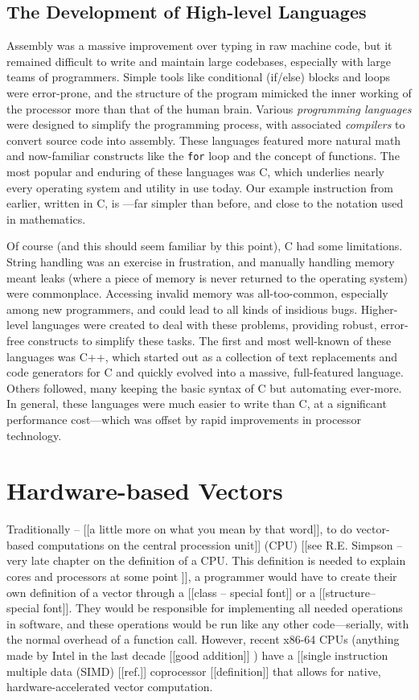 \documentclass[12pt,twoside]{reedthesis}
\begin{document}
\subsection{The Development of High-level Languages}

Assembly was a massive improvement over typing in raw machine code, but it remained difficult to write and maintain large codebases, especially with large teams of programmers. Simple tools like conditional (if/else) blocks and loops were error-prone, and the structure of the program mimicked the inner working of the processor more than that of the human brain. Various \emph{programming languages} were designed to simplify the programming process, with associated \emph{compilers} to convert source code into assembly. These languages featured more natural math and now-familiar constructs like the \texttt{for} loop and the concept of functions. The most popular and enduring of these languages was C, which underlies nearly every operating system and utility in use today. Our example instruction from earlier, written in C, is ---far simpler than before, and close to the notation used in mathematics.

Of course (and this should seem familiar by this point), C had some limitations. String handling was an exercise in frustration, and manually handling memory meant leaks (where a piece of memory is never returned to the operating system) were commonplace. Accessing invalid memory was all-too-common, especially among new programmers, and could lead to all kinds of insidious bugs. Higher-level languages were created to deal with these problems, providing robust, error-free constructs to simplify these tasks. The first and most well-known of these languages was C++, which started out as a collection of text replacements and code generators for C and quickly evolved into a massive, full-featured language. Others followed, many keeping the basic syntax of C but automating ever-more. In general, these languages were much easier to write than C, at a significant performance cost---which was offset by rapid improvements in processor technology.

\section{Hardware-based Vectors}

Traditionally -- [[a little more on what you mean by that word]], to do vector-based computations on the central procession unit]] (CPU) [[see R.E. Simpson -- very late chapter on the definition of a CPU.  This definition is needed to explain cores and processors at some point ]], a programmer would have to create their own definition of a vector through a [[class  -- special font]] or a [[structure-- special font]]. They would be responsible for implementing all needed operations in software, and these operations would be run like any other code---serially, with the normal overhead of a function call. However, recent x86-64 CPUs (anything made by Intel in the last decade [[good addition]] ) have a [[single instruction multiple data (SIMD) [[ref.]] coprocessor [[definition]] that allows for native, hardware-accelerated vector computation.
\end{document}
